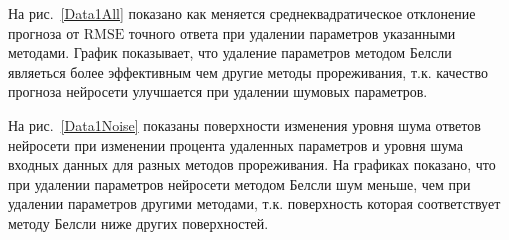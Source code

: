 На рис.~\ref{Data1All} показано как меняется среднеквадратическое отклонение прогноза от $\text{RMSE}$ точного ответа при удалении параметров указанными методами. График показывает, что удаление параметров методом Белсли являеться более эффективным чем другие методы прореживания, т.к. качество прогноза нейросети улучшается при удалении шумовых параметров.

На рис.~\ref{Data1Noise} показаны поверхности изменения уровня шума ответов нейросети при изменении процента удаленных параметров и уровня шума входных данных для разных методов прореживания. На графиках показано, что при удалении параметров нейросети методом Белсли шум меньше, чем при удалении параметров другими методами, т.к. поверхность которая соответствует методу Белсли ниже других поверхностей.

